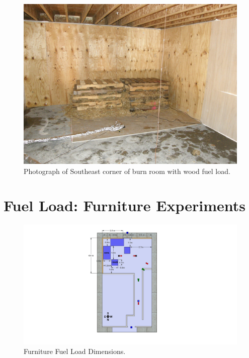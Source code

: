 \documentclass[12pt,oneside]{book}
\begin{document}
\begin{figure}[!ht]
	\includegraphics[width=6in]{../Figures/Pictures/Wood_Fuel_Package}
	\caption{Photograph of Southeast corner of burn room with wood fuel load.}
	\label{fig:Wood_Fuel_Load}
\end{figure}

\section{Fuel Load: Furniture Experiments}
\label{sec:Fuel_Load:_Furniture_Experiments}

\begin{figure}[!ht]
	\includegraphics[width=6in]{../Figures/Pictures/DelCoSingleStoryFurnitureFuelLoad}
	\caption{Furniture Fuel Load Dimensions.}
	\label{fig:Furniture_Fuel_Load_Dimensions}
\end{figure}
\end{document}
